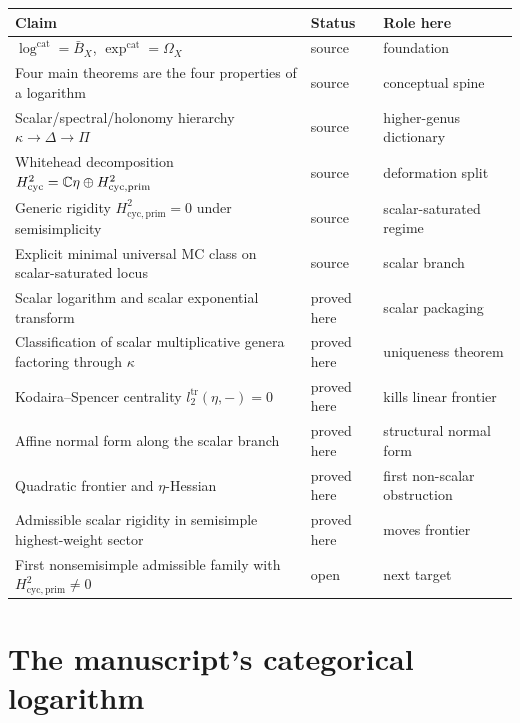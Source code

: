 \begin{summary}
\label{sum:claim-ledger}
\begin{center}
\renewcommand{\arraystretch}{1.2}
\begin{tabular}{p{6.1cm}p{2.2cm}p{4.9cm}}
\textbf{Claim} & \textbf{Status} & \textbf{Role here} \\
\hline
$\log^{\mathrm{cat}}=\bar B_X$, $\exp^{\mathrm{cat}}=\Omega_X$ & source & foundation \\
Four main theorems are the four properties of a logarithm & source & conceptual spine \\
Scalar/spectral/holonomy hierarchy $\kappa\to\Delta\to\Pi$ & source & higher-genus dictionary \\
Whitehead decomposition $H^2_{\mathrm{cyc}}=\mathbb{C}\eta\oplus H^2_{\mathrm{cyc,prim}}$ & source & deformation split \\
Generic rigidity $H^2_{\mathrm{cyc,prim}}=0$ under semisimplicity & source & scalar-saturated regime \\
Explicit minimal universal MC class on scalar-saturated locus & source & scalar branch \\
Scalar logarithm and scalar exponential transform & proved here & scalar packaging \\
Classification of scalar multiplicative genera factoring through $\kappa$ & proved here & uniqueness theorem \\
Kodaira--Spencer centrality $l_2^{\mathrm{tr}}(\eta,-)=0$ & proved here & kills linear frontier \\
Affine normal form along the scalar branch & proved here & structural normal form \\
Quadratic frontier and $\eta$-Hessian & proved here & first non-scalar obstruction \\
Admissible scalar rigidity in semisimple highest-weight sector & proved here & moves frontier \\
First nonsemisimple admissible family with $H^2_{\mathrm{cyc,prim}}\neq 0$ & open & next target \\
\end{tabular}
\end{center}
\end{summary}

\section{The manuscript's categorical logarithm}
\label{sec:manuscript-categorical-log}

